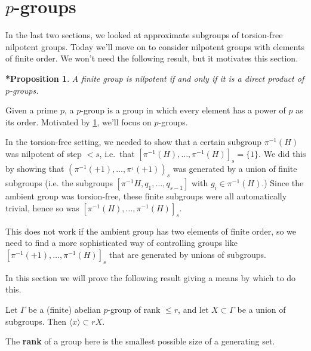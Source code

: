 \documentclass{article}
\newtheorem{nprop*}[nthm]{*Proposition}
\newcommand{\named}[1]{\textbf{#1}\index{#1}}
\numberwithin{equation}{section}
\begin{document}
\clearpage
\section{\texorpdfstring{$p$}{p}-groups}
In the last two sections, we looked at approximate subgroups of torsion-free nilpotent groups.
Today we'll move on to consider nilpotent groups with elements of finite order.
We won't need the following result, but it motivates this section.
\begin{nprop*}\label{prop:11.1}
  A finite group is nilpotent if and only if it is a direct product of $p$-groups.
\end{nprop*}
Given a prime $p$, a $p$-group is a group in which every element has a power of $p$ as its order.
Motivated by \cref{prop:11.1}, we'll focus on $p$-groups.

In the torsion-free setting, we needed to show that a certain subgroup $\pi^{-1}(H)$ was nilpotent of step $< s$, i.e.\ that $[\pi^{-1}(H), \dotsc, \pi^{-1}(H)]_s = \{1\}$.
We did this by showing that $(\pi^{-1}(+1), \dotsc, \pi^{_1}(+1))_s$ was generated by a union of finite subgroups (i.e. the subgroups $[\pi^{-1} H, q_1, \dotsc, q_{s-1}]$ with $g_i \in \pi^{-1}(H)$.)
Since the ambient group was torsion-free, these finite subgroups were all automatically trivial, hence so was $[\pi^{-1}(H), \dotsc, \pi^{-1}(H)]_s$.

This does not work if the ambient group has two elements of finite order, so we need to find a more sophisticated way of controlling groups like $[\pi^{-1}(+1), \dotsc, \pi^{-1}(H)]_s$ that are generated by unions of subgroups.

In this section we will prove the following result giving a means by which to do this.
\begin{nprop}\label{prop:11.2}
  Let $\Gamma$ be a (finite) abelian $p$-group of rank $\leq r$, and let $X \subset \Gamma$ be a union of subgroups. Then $\langle x \rangle \subset r X$.
\end{nprop}

The \named{rank} of a group here is the smallest possible size of a generating set.
\end{document}
